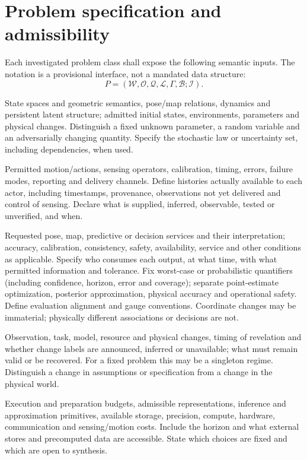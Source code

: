 \documentclass[11pt,letterpaper]{article}
\begin{document}
\section{Problem specification and admissibility}
\label{sec:spec}
Each investigated problem class shall expose the following semantic inputs. The notation is a provisional interface, not a mandated data structure:
\[
 P=(\mathcal W,\mathcal O,\mathcal Q,\mathcal L,\Gamma,\mathcal B;\mathcal I).
\]
\begin{description}[leftmargin=1.7em,style=nextline,itemsep=2pt]
\item[$\mathcal W$ --- World and robot model.] State spaces and geometric semantics, pose/map relations, dynamics and persistent latent structure; admitted initial states, environments, parameters and physical changes. Distinguish a fixed unknown parameter, a random variable and an adversarially changing quantity. Specify the stochastic law or uncertainty set, including dependencies, when used.
\item[$\mathcal O$ --- Acquisition and information.] Permitted motion/actions, sensing operators, calibration, timing, errors, failure modes, reporting and delivery channels. Define histories actually available to each actor, including timestamps, provenance, observations not yet delivered and control of sensing. Declare what is supplied, inferred, observable, tested or unverified, and when.
\item[$\mathcal Q,\mathcal L$ --- Queries and demanded law.] Requested pose, map, predictive or decision services and their interpretation; accuracy, calibration, consistency, safety, availability, service and other conditions as applicable. Specify who consumes each output, at what time, with what permitted information and tolerance. Fix worst-case or probabilistic quantifiers (including confidence, horizon, error and coverage); separate point-estimate optimization, posterior approximation, physical accuracy and operational safety. Define evaluation alignment and gauge conventions. Coordinate changes may be immaterial; physically different associations or decisions are not.
\item[$\Gamma$ --- Admitted continuations.] Observation, task, model, resource and physical changes, timing of revelation and whether change labels are announced, inferred or unavailable; what must remain valid or be recovered. For a fixed problem this may be a singleton regime. Distinguish a change in assumptions or specification from a change in the physical world.
\item[$\mathcal B,\mathcal I$ --- Resources and implementation class.] Execution and preparation budgets, admissible representations, inference and approximation primitives, available storage, precision, compute, hardware, communication and sensing/motion costs. Include the horizon and what external stores and precomputed data are accessible. State which choices are fixed and which are open to synthesis.
\end{description}
\end{document}
